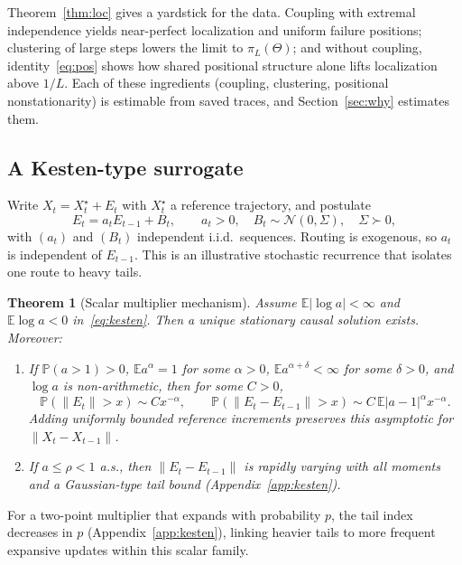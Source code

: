 \documentclass{article}
\newtheorem{theorem}[proposition]{Theorem}
\newcommand{\PP}{\mathbb{P}}
\newcommand{\EE}{\mathbb{E}}
\newcommand{\1}{\mathbf{1}}
\begin{document}
Theorem~\ref{thm:loc} gives a yardstick for the data. Coupling with extremal independence yields near-perfect localization and uniform failure positions; clustering of large steps lowers the limit to $\pi_L(\Theta)$; and without coupling, identity~\eqref{eq:pos} shows how shared positional structure alone lifts localization above $1/L$. Each of these ingredients (coupling, clustering, positional nonstationarity) is estimable from saved traces, and Section~\ref{sec:why} estimates them.

\subsection{A Kesten-type surrogate}

Write $X_t=X_t^\star+E_t$ with $X_t^\star$ a reference trajectory, and postulate
\begin{equation}\label{eq:kesten}
E_t=a_tE_{t-1}+B_t,\qquad a_t>0,\quad B_t\sim\mathcal N(0,\Sigma),\quad\Sigma\succ0,
\end{equation}
with $(a_t)$ and $(B_t)$ independent i.i.d.\ sequences. Routing is exogenous, so $a_t$ is independent of $E_{t-1}$. This is an illustrative stochastic recurrence \citep{kesten1973,goldie1991,buraczewski2016} that isolates one route to heavy tails.

\begin{theorem}[Scalar multiplier mechanism]\label{thm:kesten}
Assume $\EE|\log a|<\infty$ and $\EE\log a<0$ in~\eqref{eq:kesten}. Then a unique stationary causal solution exists. Moreover:
\begin{enumerate}
\item[(i)] If $\PP(a>1)>0$, $\EE a^\alpha=1$ for some $\alpha>0$, $\EE a^{\alpha+\delta}<\infty$ for some $\delta>0$, and $\log a$ is non-arithmetic, then for some $C>0$,
\begin{equation}\label{eq:kestentail}
\PP(\|E_t\|>x)\sim Cx^{-\alpha},\qquad \PP(\|E_t-E_{t-1}\|>x)\sim C\,\EE|a-1|^\alpha x^{-\alpha}.
\end{equation}
Adding uniformly bounded reference increments preserves this asymptotic for $\|X_t-X_{t-1}\|$.
\item[(ii)] If $a\le\rho<1$ a.s., then $\|E_t-E_{t-1}\|$ is rapidly varying with all moments and a Gaussian-type tail bound (Appendix~\ref{app:kesten}).
\end{enumerate}
\end{theorem}
For a two-point multiplier that expands with probability $p$, the tail index decreases in $p$ (Appendix~\ref{app:kesten}), linking heavier tails to more frequent expansive updates within this scalar family.
\end{document}
